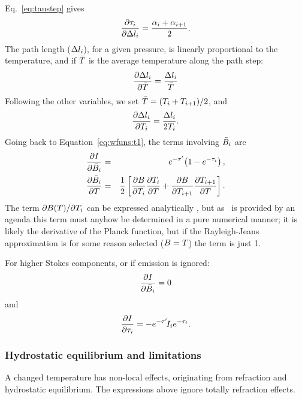 Eq.~\ref{eq:taustep} gives
\begin{equation}
  \frac{\partial \tau_{i}}{\partial \Delta l_{i}} = 
  \frac{{\alpha}_{i}+{\alpha}_{i+1}}{2}. 
\end{equation}
The path length ($\Delta l_{i}$), for a given pressure, is linearly
proportional to the temperature, and if $\bar{T}$ is the average temperature
along the path step:
\begin{equation}
  \frac{\partial \Delta l_{i}}{\partial \bar{T}} =   
                                    \frac{\Delta l_{i}}{\bar{T}} 
\end{equation}
Following the other variables, we set $\bar{T}=(T_{i}+T_{i+1})/2$, and
\begin{equation}
  \frac{\partial \Delta l_{i}}{\partial T_{i}} = 
                                    \frac{\Delta l_{i}}{2T_{i}}.
\end{equation}
Going back to Equation~\ref{eq:wfuns:t1}, the terms involving $\bar{B}_i$
are
\begin{eqnarray}
   \frac{\partial I}{\partial \bar{B}_i} &=&
   e^{-\tau'}\!\left(1-e^{-\tau_{i}}\right), \\
   \frac{\partial \bar{B}_i}{\partial T} &=& \frac{1}{2}\left[
    \frac{\partial B}{\partial T_{i}} \frac{\partial T_{i}}{\partial T} +
    \frac{\partial B}{\partial T_{i+1}} \frac{\partial T_{i+1}}{\partial T}
  \right].
\end{eqnarray}
The term $\partial B(T)/\partial T_{i}$ can be expressed analytically
\citep{eriksson:studi:02}, but as \Planck\ is provided by an agenda this term
must anyhow be determined in a pure numerical manner; it is likely the
derivative of the Planck function, but if the Rayleigh-Jeans approximation is
for some reason selected ($B=T$) the term is just 1.

For higher Stokes components, or if emission is ignored:
\begin{equation}
   \frac{\partial I}{\partial \bar{B}_i} = 0  
\end{equation}
and
\begin{equation}
  \frac{\partial I}{\partial \tau_{i}}  = -e^{-\tau'}\!I_{i}e^{-\tau_{i}}.
\end{equation}



\subsubsection{Hydrostatic equilibrium and limitations}
%
A changed temperature has non-local effects, originating from refraction and
hydrostatic equilibrium. The expressions above ignore totally refraction
effects. 


